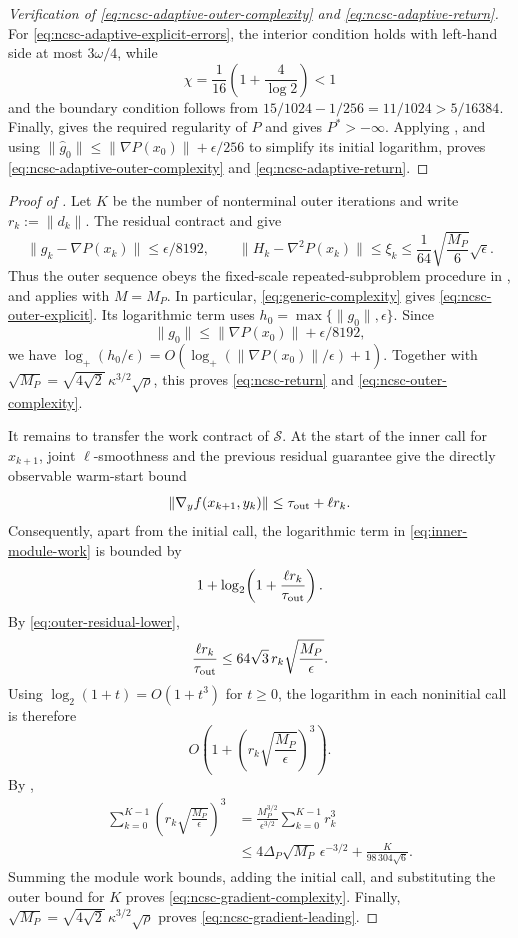\documentclass{article}
\begin{document}
\begin{proof}[Verification of
\eqref{eq:ncsc-adaptive-outer-complexity} and
\eqref{eq:ncsc-adaptive-return}]
For \eqref{eq:ncsc-adaptive-explicit-errors}, the interior condition
holds with left-hand side at most $3\omega/4$, while
\[
 \chi=\frac1{16}\left(1+\frac4{\log2}\right)<1
\]
and the boundary condition follows from
$15/1024-1/256=11/1024>5/16384$.
Finally,  gives the required regularity of
$P$ and  gives $P^*>-\infty$.  Applying
, and using
$\|\widehat g_0\|\le\|\nabla P(x_0)\|+\epsilon/256$ to simplify its
initial logarithm, proves
\eqref{eq:ncsc-adaptive-outer-complexity} and
\eqref{eq:ncsc-adaptive-return}.
\end{proof}

\begin{proof}[Proof of ]
Let $K$ be the number of nonterminal outer iterations and write
$r_k:=\|d_k\|$.
The residual contract and  give
\[
 \|g_k-\nabla P(x_k)\|\le\epsilon/8192,
 \qquad
 \|H_k-\nabla^2P(x_k)\|\le\xi_k
 \le\frac1{64}\sqrt{\frac{M_P}{6}}\sqrt\epsilon.
\]
Thus the outer sequence obeys the fixed-scale repeated-subproblem
procedure in
, and  applies with
$M=M_P$.  In particular, \eqref{eq:generic-complexity} gives
\eqref{eq:ncsc-outer-explicit}.  Its logarithmic term uses
$h_0=\max\{\|g_0\|,\epsilon\}$.  Since
\[
 \|g_0\|\le\|\nabla P(x_0)\|+\epsilon/8192,
\]
we have
$\log_+(h_0/\epsilon)
=O(\log_+(\|\nabla P(x_0)\|/\epsilon)+1)$.
Together with
$\sqrt{M_P}=\sqrt{4\sqrt2}\,\kappa^{3/2}\sqrt\rho$, this proves
\eqref{eq:ncsc-return} and \eqref{eq:ncsc-outer-complexity}.

It remains to transfer the work contract of $\mathcal S$.  At the
start of the inner call for $x_{k+1}$, joint $\ell$-smoothness and the
previous residual guarantee give the directly observable warm-start
bound
\[
 \|\nabla_yf(x_{k+1},y_k)\|
 \le\tau_{\rm out}+\ell r_k.
\]
Consequently, apart from the initial call, the logarithmic term in
\eqref{eq:inner-module-work} is bounded by
\[
 1+\log_2\!\left(1+\frac{\ell r_k}{\tau_{\rm out}}\right).
\]
By \eqref{eq:outer-residual-lower},
\[
 \frac{\ell r_k}{\tau_{\rm out}}
 \le64\sqrt3\,r_k\sqrt{\frac{M_P}{\epsilon}}.
\]
Using $\log_2(1+t)=O(1+t^3)$ for $t\ge0$, the logarithm in
each noninitial call is therefore
\[
 O\!\left(
  1+
  \left(r_k\sqrt{\frac{M_P}{\epsilon}}\right)^3
 \right).
\]
By ,
\begin{align*}
 \sum_{k=0}^{K-1}
 \left(r_k\sqrt{\frac{M_P}{\epsilon}}\right)^3
 &=\frac{M_P^{3/2}}{\epsilon^{3/2}}
   \sum_{k=0}^{K-1}r_k^3\\
 &\le4\Delta_P\sqrt{M_P}\,\epsilon^{-3/2}
 +\frac{K}{98\,304\sqrt6}.
\end{align*}
Summing the module work bounds, adding the initial call, and
substituting the outer bound for $K$ proves
\eqref{eq:ncsc-gradient-complexity}.  Finally,
$\sqrt{M_P}=\sqrt{4\sqrt2}\,\kappa^{3/2}\sqrt\rho$ proves
\eqref{eq:ncsc-gradient-leading}.
\end{proof}
\end{document}
